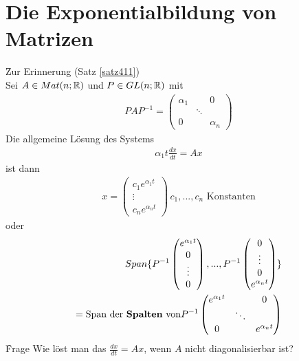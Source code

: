 \section{Die Exponentialbildung von Matrizen}
\f{Zur Erinnerung} (Satz \ref{satz411}) \\
Sei $A \in Mat(n; \mathbb{R})$ und $P \in GL(n;\mathbb{R})$ mit
\begin{align}
PAP^{-1} = \begin{pmatrix} \alpha_1 & & 0 \\ & \ddots & \\ 0 & & \alpha_n \end{pmatrix}
\end{align}
Die allgemeine Lösung des Systems
\begin{align}
\alpha_1 t \frac{dx}{dt} = Ax
\end{align}
ist dann
\begin{align}
x = \begin{pmatrix} c_1 e^{\alpha_1 t} \\ \vdots \\ c_n e^{\alpha_n t}\end{pmatrix} \, \text{$c_1, ..., c_n$ Konstanten}
\end{align}
oder
\begin{align}
Span\{P^{-1} \begin{pmatrix} e^{\alpha_1 t} \\ 0 \\ \vdots \\ 0 \end{pmatrix}, ..., P^{-1} \begin{pmatrix} 0 \\ \vdots \\ 0 \\ e^{\alpha_n t}\end{pmatrix}\} \\
= \text{Span der \textbf{Spalten} von} P^{-1} \begin{pmatrix} e^{\alpha_1 t} & & 0 \\ & \ddots & \\ 0 & & e^{\alpha_n t} \end{pmatrix}
\end{align}
\f{Frage} Wie löst man das $\frac{dx}{dt} = Ax$, wenn $A$ nicht diagonalisierbar ist?

